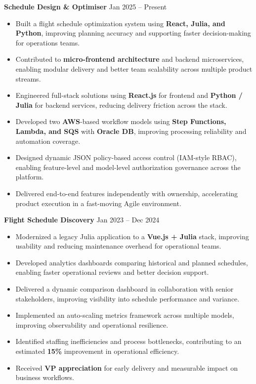 \documentclass[10pt,a4paper]{article}
\begin{document}
\textbf{Schedule Design \& Optimiser} \hfill Jan 2025 -- Present

\begin{itemize}[leftmargin=*]
\item Built a flight schedule optimization system using \textbf{React, Julia, and Python}, improving planning accuracy and supporting faster decision-making for operations teams.
\item Contributed to \textbf{micro-frontend architecture} and backend microservices, enabling modular delivery and better team scalability across multiple product streams.
\item Engineered full-stack solutions using \textbf{React.js} for frontend and \textbf{Python / Julia} for backend services, reducing delivery friction across the stack.
\item Developed two \textbf{AWS}-based workflow models using \textbf{Step Functions, Lambda, and SQS} with \textbf{Oracle DB}, improving processing reliability and automation coverage.
\item Designed dynamic JSON policy-based access control (IAM-style RBAC), enabling feature-level and model-level authorization governance across the platform.
\item Delivered end-to-end features independently with ownership, accelerating product execution in a fast-moving Agile environment.
\end{itemize}

\textbf{Flight Schedule Discovery} \hfill Jan 2023 -- Dec 2024

\begin{itemize}[leftmargin=*]
\item Modernized a legacy Julia application to a \textbf{Vue.js + Julia} stack, improving usability and reducing maintenance overhead for operational teams.
\item Developed analytics dashboards comparing historical and planned schedules, enabling faster operational reviews and better decision support.
\item Delivered a dynamic comparison dashboard in collaboration with senior stakeholders, improving visibility into schedule performance and variance.
\item Implemented an auto-scaling metrics framework across multiple models, improving observability and operational resilience.
\item Identified staffing inefficiencies and process bottlenecks, contributing to an estimated \textbf{15\%} improvement in operational efficiency.
\item Received \textbf{VP appreciation} for early delivery and measurable impact on business workflows.
\end{itemize}
\end{document}
